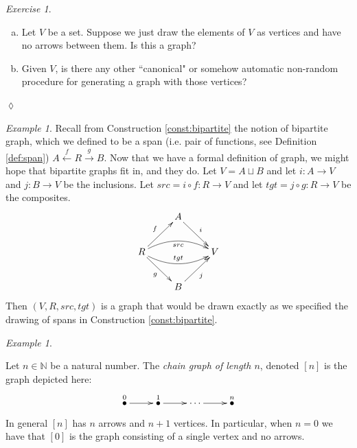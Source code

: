 \documentclass{book}
\def\NN{{\mathbb N}}
\def\to{\rightarrow}
\def\taking{\colon}
\newcommand{\LMO}[1]{\stackrel{#1}{\bullet}}
\newcommand{\To}[1]{\xrightarrow{#1}}
\newcommand{\From}[1]{\xleftarrow{#1}}
\theoremstyle{remark}
\newtheorem{example}[subsubsection]{Example}
\newtheorem{exc}[subsubsection]{Exercise}
\newenvironment{exercise}{\begin{exc}}{\hspace*{\fill}$\lozenge$\end{exc}}
\theoremstyle{definition}
\def\sexc{\begin{enumerate}[a.)]\setlength{\itemsep}{.1cm}\setlength{\parskip}{.1cm}\item}
\def\next{\item}
\def\endsexc{\end{enumerate}}
\begin{document}
\begin{exercise}~
\sexc Let $V$ be a set. Suppose we just draw the elements of $V$ as vertices and have no arrows between them. Is this a graph?
\next Given $V$, is there any other ``canonical" or somehow automatic non-random procedure for generating a graph with those vertices? 
\endsexc
\end{exercise}

\begin{example}

Recall from Construction \ref{const:bipartite} the notion of bipartite graph, which we defined to be a span (i.e. pair of functions, see Definition \ref{def:span}) $A\From{f}R\To{g}B$. Now that we have a formal definition of graph, we might hope that bipartite graphs fit in, and they do. Let $V=A\sqcup B$ and let $i\taking A\to V$ and $j\taking B\to V$ be the inclusions. Let $src=i\circ f\taking R\to V$ and let $tgt=j\circ g\taking R\to V$ be the composites.
$$
\xymatrix{&A\ar[dr]^i\\R\ar@/^1pc/[rr]_{src}\ar@/_1pc/[rr]^{tgt}\ar[ur]^f\ar[dr]_g&&V\\&B\ar[ur]_j}
$$ 
Then $(V,R,src,tgt)$ is a graph that would be drawn exactly as we specified the drawing of spans in Construction \ref{const:bipartite}.

\end{example}

\begin{example}\label{ex:[n] as graph}

Let $n\in\NN$ be a natural number. The {\em chain graph of length $n$}, denoted $[n]$ is the graph depicted here:
$$
\xymatrix{
\LMO{0}\ar[r]&\LMO{1}\ar[r]&\cdots\ar[r]&\LMO{n}
}
$$
In general $[n]$ has $n$ arrows and $n+1$ vertices. In particular, when $n=0$ we have that $[0]$ is the graph consisting of a single vertex and no arrows. 

\end{example}
\end{document}

